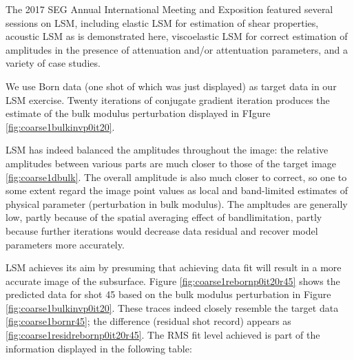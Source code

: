 The 2017 SEG Annual International Meeting and Exposition featured
several sessions on LSM, including elastic LSM for estimation of shear
properties, acoustic LSM as is demonstrated here, viscoelastic LSM for
correct estimation of amplitudes in the presence of attenuation and/or
attentuation parameters, and a variety of case studies.

We use Born data (one shot of which was just displayed) as target data
in our LSM exercise. Twenty iterations of conjugate gradient iteration
produces the estimate of the bulk modulus perturbation displayed in
FIgure \ref{fig:coarse1bulkinvp0it20}.


LSM has indeed balanced the amplitudes throughout the image: the
relative amplitudes between various parts are much closer to those of
the target image \ref{fig:coarse1dbulk}. The overall amplitude is also
much closer to correct, so one to some extent regard the image point
values as local and band-limited estimates of physical
parameter (perturbation in bulk modulus). The ampltudes are generally
low, partly because of the spatial averaging effect of bandlimitation,
partly because further iterations would decrease data residual and
recover model parameters more accurately.

LSM achieves its aim by presuming that achieving data fit will result
in a more accurate image of the subsurface. Figure
\ref{fig:coarse1rebornp0it20r45} shows the predicted data for
shot 45 based on the bulk modulus perturbation in Figure
\ref{fig:coarse1bulkinvp0it20}. These traces indeed closely resemble
the target data \ref{fig:coarse1bornr45}; the difference (residual
shot record) appears as \ref{fig:coarse1residrebornp0it20r45}. The RMS
fit level achieved is part of the information displayed in the
following table:

